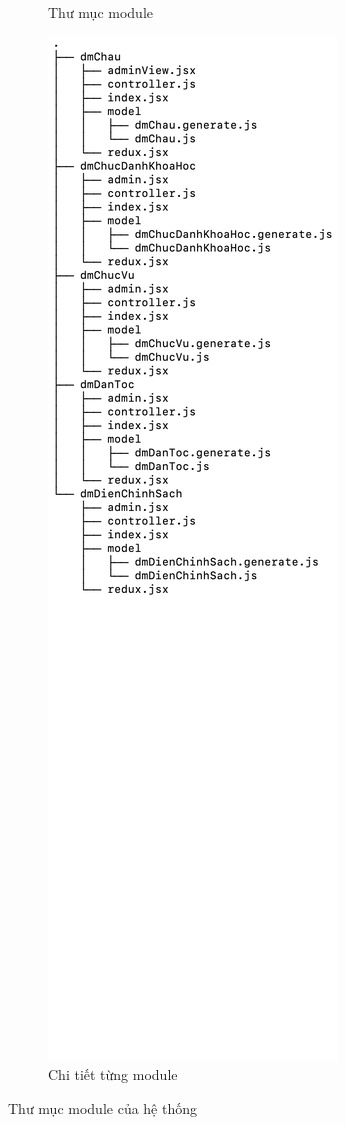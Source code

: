 \begin{figure}[H]
\begin{subfigure}[b]{0.4\linewidth}
        \caption{Thư mục module}
    \end{subfigure}
    \begin{subfigure}[b]{0.4\linewidth}
        \includegraphics[width=\linewidth]{img/moduleDetail.png}
        \caption{Chi tiết từng module}
    \end{subfigure}
    \caption{Thư mục module của hệ thống}
\end{figure}





